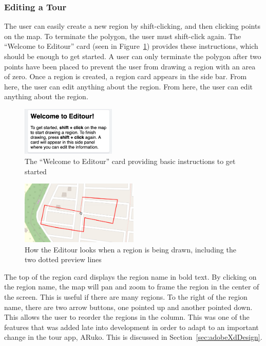 \documentclass[a4paper, 10pt, american, titlepage]{article}
\begin{document}
\subsubsection{Editing a Tour}
\label{sec:editingATour}

The user can easily create a new region by shift-clicking, and then clicking
points on the map.  To terminate the polygon, the user must shift-click again.
The ``Welcome to Editour'' card (seen in Figure~\ref{fig:welcomeCard}) provides
these instructions, which should be enough to get started.  A user can only
terminate the polygon after two points have been placed to prevent the user
from drawing a region with an area of zero. Once a region is created, a region
card appears in the side bar. From here, the user can edit anything about the
region. From here, the user can edit anything about the region.

\begin{figure}[h]
	\centering
	\includegraphics[width=0.4\textwidth]{welcome-card-editour.png}
    \caption{The ``Welcome to Editour'' card providing basic instructions to
    get started}
	\label{fig:welcomeCard}
\end{figure}

\begin{figure}[h]
	\centering
	\includegraphics[width=0.5\textwidth]{drawing-region-editour.png}
    \caption{How the Editour looks when a region is being drawn, including the
    two dotted preview lines}
	\label{fig:drawingRegion}
\end{figure}


The top of the region card displays the region name in bold text. By clicking
on the region name, the map will pan and zoom to frame the region in the center
of the screen. This is useful if there are many regions. To the right of the
region name, there are two arrow buttons, one pointed up and another pointed
down. This allows the user to reorder the regions in the column. This was one
of the features that was added late into development in order to adapt to an
important change in the tour app, ARuko. This is discussed in
Section~\ref{sec:adobeXdDesign}.
\end{document}
